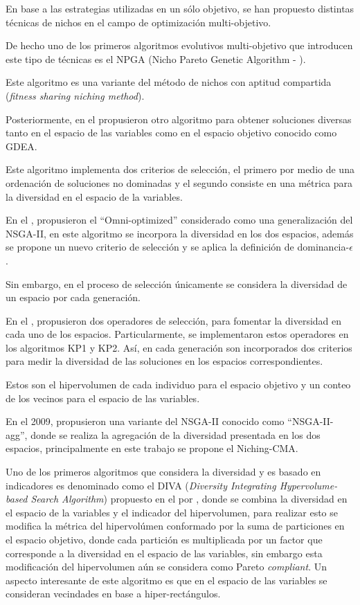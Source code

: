 %
En base a las estrategias utilizadas en un sólo objetivo, se han propuesto distintas técnicas de nichos en el campo de optimización multi-objetivo.

%
De hecho uno de los primeros algoritmos evolutivos multi-objetivo que introducen este tipo de técnicas es el NPGA (Nicho Pareto Genetic Algorithm - \cite{Joel:NPGA}).

%
Este algoritmo es una variante del método de nichos con aptitud compartida (\textit{fitness sharing niching method}).

%
Posteriormente, \citeauthor{toffolo2003genetic} en el \citeyear{toffolo2003genetic} propusieron otro algoritmo para obtener soluciones diversas tanto en el espacio de las variables como en el espacio objetivo conocido como GDEA.

%
Este algoritmo implementa dos criterios de selección, el primero por medio de una ordenación de soluciones no dominadas y el segundo consiste en una métrica para la diversidad en el espacio de la variables.

%

En el \citeyear{deb2005omni}, \citeauthor{deb2005omni} propusieron el ``Omni-optimized'' considerado como una generalización del NSGA-II, en este algoritmo se incorpora la diversidad en los dos espacios, además se propone un nuevo criterio de selección y se aplica la definición de dominancia-$\epsilon$.

%
Sin embargo, en el proceso de selección únicamente se considera la diversidad de un espacio por cada generación.


En el \citeyear{chan2005evolutionary}, \citeauthor{chan2005evolutionary} propusieron dos operadores de selección, para fomentar la diversidad en cada uno de los espacios.
%
Particularmente, se implementaron estos operadores en los algoritmos KP1 y KP2.
%
Así, en cada generación son incorporados dos criterios para medir la diversidad de las soluciones en los espacios correspondientes.

%
Estos son el hipervolumen de cada individuo para el espacio objetivo y un conteo de los vecinos para el espacio de las variables.


En el 2009, \citeauthor{shir2009enhancing} propusieron una variante del NSGA-II conocido como ``NSGA-II-agg'', donde se realiza la agregación de la diversidad presentada en los dos espacios, principalmente en este trabajo se propone el Niching-CMA.
%
%

Uno de los primeros algoritmos que considera la diversidad y es basado en indicadores es denominado como el DIVA (\textit{Diversity Integrating Hypervolume-based Search Algorithm}) propuesto en el \citeyear{ulrich2010integrating} por \citeauthor{ulrich2010integrating}, donde se combina la diversidad en el espacio de la variables y el indicador del hipervolumen, para realizar esto se modifica la métrica del hipervolúmen conformado por la suma de particiones en el espacio objetivo, donde cada partición es multiplicada por un factor que corresponde a la diversidad en el espacio de las variables, sin embargo esta modificación del hipervolumen aún se considera como Pareto \textit{compliant}.
%
Un aspecto interesante de este algoritmo es que en el espacio de las variables se consideran vecindades en base a hiper-rectángulos.


